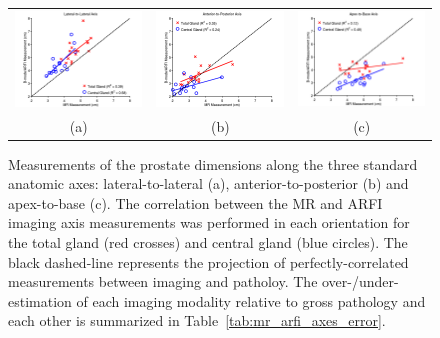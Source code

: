 \begin{figure}[htb!]
\centering
\begin{tabular}{ccc}
\includegraphics[width=0.3\linewidth]{figs/Imaging_Lateral-to-Lateral} &
\includegraphics[width=0.3\linewidth]{figs/Imaging_Anterior-to-Posterior} &
\includegraphics[width=0.3\linewidth]{figs/Imaging_Apex-to-Base} \\
(a) & (b) & (c) \\
\end{tabular}
\caption{Measurements of the prostate dimensions along the three standard
    anatomic axes: lateral-to-lateral (a), anterior-to-posterior (b) and
    apex-to-base (c).  The correlation between the MR and ARFI imaging axis
    measurements was performed in each orientation for the total gland (red
    crosses) and central gland (blue circles).  The black dashed-line represents
    the projection of perfectly-correlated measurements between imaging and
    patholoy.  The over-/under-estimation of each imaging modality relative to
    gross pathology and each other is summarized in
    Table~\ref{tab:mr_arfi_axes_error}.} 
\label{fig:mr_arfi_path_axes}
\end{figure}

